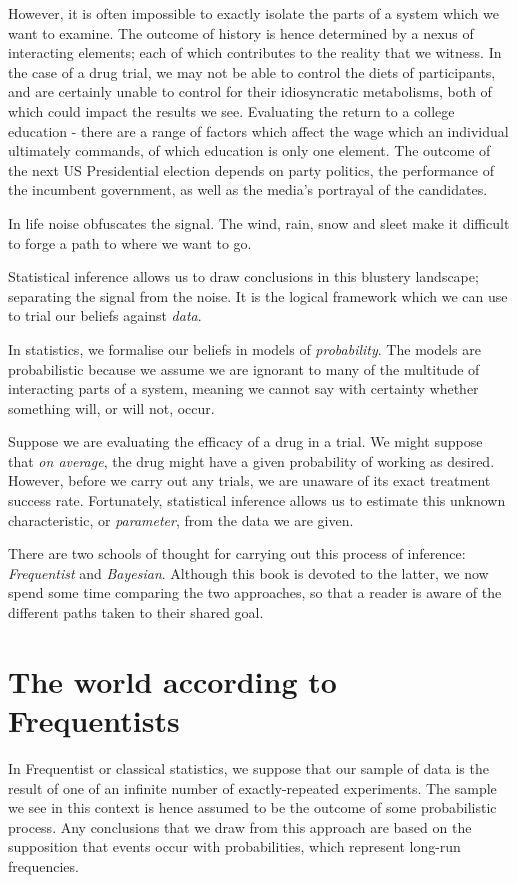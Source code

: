 \documentclass[11pt,fullpage]{book}
\begin{document}
However, it is often impossible to exactly isolate the parts of a system which we want to examine. The outcome of history is hence determined by a nexus of interacting elements; each of which contributes to the reality that we witness. In the case of a drug trial, we may not be able to control the diets of participants, and are certainly unable to control for their idiosyncratic metabolisms, both of which could impact the results we see. Evaluating the return to a college education - there are a range of factors which affect the wage which an individual ultimately commands, of which education is only one element. The outcome of the next US Presidential election depends on party politics, the performance of the incumbent government, as well as the media's portrayal of the candidates. 

In life noise obfuscates the signal. The wind, rain, snow and sleet make it difficult to forge a path to where we want to go.

Statistical inference allows us to draw conclusions in this blustery landscape; separating the signal from the noise. It is the logical framework which we can use to trial our beliefs against \textit{data}. 

In statistics, we formalise our beliefs in models of \textit{probability}. The models are probabilistic because we assume we are ignorant to many of the multitude of interacting parts of a system, meaning we cannot say with certainty whether something will, or will not, occur.

Suppose we are evaluating the efficacy of a drug in a trial. We might suppose that \textit{on average}, the drug might have a given probability of working as desired. However, before we carry out any trials, we are unaware of its exact treatment success rate. Fortunately, statistical inference allows us to estimate this unknown characteristic, or \textit{parameter}, from the data we are given. 

There are two schools of thought for carrying out this process of inference: \textit{Frequentist} and \textit{Bayesian}. Although this book is devoted to the latter, we now spend some time comparing the two approaches, so that a reader is aware of the different paths taken to their shared goal.

\section{The world according to Frequentists}\label{sec:Intro_FrequentistsWorld}
In Frequentist or classical statistics, we suppose that our sample of data is the result of one of an infinite number of exactly-repeated experiments. The sample we see in this context is hence assumed to be the outcome of some probabilistic process. Any conclusions that we draw from this approach are based on the supposition that events occur with probabilities, which represent long-run frequencies. 
\end{document}
